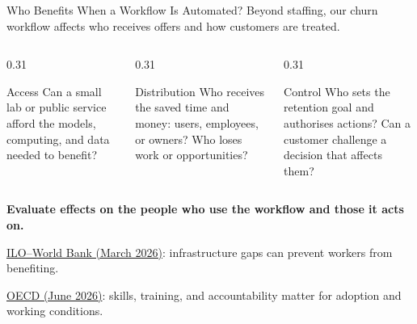 \documentclass[aspectratio=169]{beamer}
\begin{document}
\begin{frame}{Who Benefits When a Workflow Is Automated?}
  \small Beyond staffing, our churn workflow affects who receives offers and how customers are treated.
  \par\vspace{0.6em}
  \begin{columns}[T,onlytextwidth]
    \begin{column}{0.31\linewidth}
      \begin{block}{Access}
        Can a small lab or public service afford the models, computing, and data needed to benefit?
      \end{block}
    \end{column}
    \begin{column}{0.31\linewidth}
      \begin{block}{Distribution}
        Who receives the saved time and money: users, employees, or owners? Who loses work or opportunities?
      \end{block}
    \end{column}
    \begin{column}{0.31\linewidth}
      \begin{block}{Control}
        Who sets the retention goal and authorises actions? Can a customer challenge a decision that affects them?
      \end{block}
    \end{column}
  \end{columns}
  \vspace{0.5em}
  \textbf{Evaluate effects on the people who use the workflow and those it acts on.}
  \par\vspace{0.7em}
  {\footnotesize
  \href{https://www.ilo.org/publications/disruption-without-dividend-how-digital-divide-and-task-differences-split}{ILO--World Bank (March 2026)}: infrastructure gaps can prevent workers from benefiting.
  \par\vspace{0.3em}
  \href{https://www.oecd.org/en/publications/ai-and-skills_f843b352-en/full-report.html}{OECD (June 2026)}: skills, training, and accountability matter for adoption and working conditions.}
\end{frame}
\end{document}
